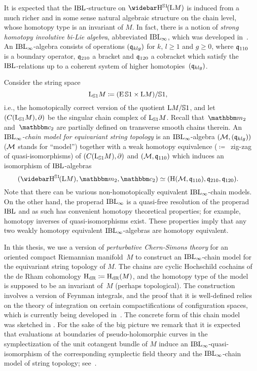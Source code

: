 \documentclass[\MainFolder/Text.tex]{subfiles}
\begin{document}
It is expected that the $\mathrm{IBL}$-structure on $\RedEquivHom(\Loop M)$ is induced from a much richer and in some sense natural algebraic structure on the chain level, whose homotopy type is an invariant of $M$.
In fact, there is a notion of \emph{strong homotopy involutive bi-Lie algebra}, abbreviated $\mathrm{IBL}_\infty$, which was developed in~\cite{Cieliebak2015}.
An $\mathrm{IBL}_\infty$-algebra consists of operations $(\mathfrak{q}_{klg})$ for $k$, $l \ge 1$ and $g\ge 0$, where $\mathfrak{q}_{110}$ is a boundary operator, $\mathfrak{q}_{210}$ a bracket and $\mathfrak{q}_{120}$ a cobracket which satisfy the $\mathrm{IBL}$-relations up to a coherent system of higher homotopies~$(\mathfrak{q}_{klg})$.

Consider the string space 
\[ \mathrm{L}_{\mathbb{S}{1}} M \coloneqq (\operatorname{E}\mathbb{S}{1}\times \mathrm{L} M)/\mathbb{S}{1}, \]
i.e., the homotopically correct version of the quotient $\mathrm{L} M/\mathbb{S}{1}$, and let $(C(\mathrm{L}_{\mathbb{S}{1}} M),\partial)$ be the singular chain complex of $\mathrm{L}_{\mathbb{S}{1}} M$.
Recall that~$\StringOp_2$ and~$\StringCoOp_2$ are partially defined on transverse smooth chains therein.
An \emph{$\mathrm{IBL}_\infty$-chain model for equivariant string topology} is an $\mathrm{IBL}_\infty$-algebra $(\mathcal{M},(\mathfrak{q}_{klg}))$ ($\mathcal{M}$ stands for ``model'') together with a weak homotopy equivalence  ($\coloneqq$~zig-zag of quasi-isomorphisms) of $(C(\mathrm{L}_{\mathbb{S}{1}} M),\partial)$ and $(\mathcal{M},\mathfrak{q}_{110})$ which induces an isomorphism of $\mathrm{IBL}$-algebras
\[ (\RedEquivHom(\Loop M),\StringOp_2,\StringCoOp_2) \simeq (\H(\Model,\OPQ_{110}), \OPQ_{210}, \OPQ_{120}). \]
Note that there can be various non-homotopically equivalent $\mathrm{IBL}_\infty$-chain models.
On the other hand, the properad $\mathrm{IBL}_\infty$ is a quasi-free resolution of the properad $\mathrm{IBL}$ and as such has convenient homotopy theoretical properties; for example, homotopy inverses of quasi-isomorphisms exist.
These properties imply that any two weakly homotopy equivalent $\mathrm{IBL}_\infty$-algebras are homotopy equivalent.


In this thesis, we use a version of \emph{perturbative Chern-Simons theory} for an oriented compact Riemannian manifold~$M$ to construct an $\mathrm{IBL}_\infty$-chain model for the equivariant string topology of $M$.
The chains are cyclic Hochschild cochains of the de Rham cohomology $\mathrm{H}_{\mathrm{dR}}\coloneqq\mathrm{H}_{\mathrm{dR}}(M)$, and the homotopy type of the model is supposed to be an invariant of~$M$ (perhaps topological).
The construction involves a version of Feynman integrals, and the proof that it is well-defined relies on the theory of integration on certain compactifications of configuration spaces, which is currently being developed in~\cite{Cieliebak2018}.
The concrete form of this chain model was sketched in \cite{Cieliebak2015}.
For the sake of the big picture we remark that it is expected that evaluations at boundaries of pseudo-holomorphic curves in the symplectization of the unit cotangent bundle of $M$ induce an $\mathrm{IBL}_\infty$-quasi-isomorphism of the corresponding symplectic field theory and the $\mathrm{IBL}_\infty$-chain model of string topology; see~\cite{Cieliebak2007}. 
\end{document}
